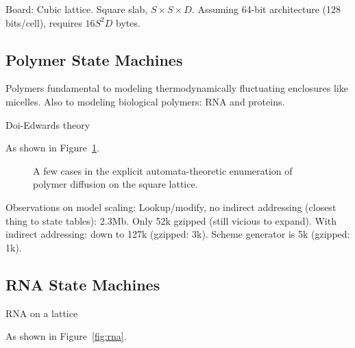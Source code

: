 \documentclass{acm_proc_article-sp}
\begin{document}
Board:
Cubic lattice.
Square slab, $S \times S \times D$.
Assuming 64-bit architecture (128 bits/cell), requires $16S^2 D$ bytes.

\subsection{Polymer State Machines}

Polymers fundamental to modeling thermodynamically fluctuating enclosures like micelles.
Also to modeling biological polymers: RNA and proteins.

Doi-Edwards theory \cite{DoiEdwards1988}

As shown in Figure~\ref{fig:polymer}.

\begin{figure}
\caption{
\label{fig:polymer}
A few cases in the explicit automata-theoretic enumeration of polymer diffusion on the square lattice.
}
\end{figure}

Observations on model scaling:
Lookup/modify, no indirect addressing (closest thing to state tables): 2.3Mb.
Only 52k gzipped (still vicious to expand).
With indirect addressing: down to 127k (gzipped: 3k).
Scheme generator is 5k (gzipped: 1k).


\subsection{RNA State Machines}

RNA on a lattice \cite{LeoniVanderzande2003,JostEveraers2010,ZaraPretti2007,GillespieMayneJiang2009}


As shown in Figure~\ref{fig:rna}.
\end{document}
